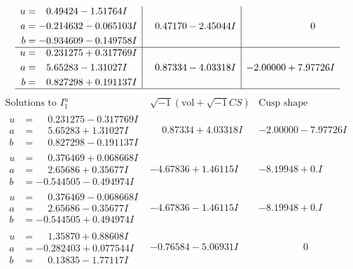 \documentclass[1p]{elsarticle_modified}
\theoremstyle{definition}
\newcommand{\I}{\sqrt{-1}}
\begin{document}
$$\begin{array}{c|c|c}
\begin{aligned}
u &= \phantom{-}0.49424 - 1.51764 I \\
a &= -0.214632 - 0.065103 I \\
b &= -0.934609 - 0.149758 I\end{aligned}
 & \phantom{-}0.47170 - 2.45044 I & \phantom{-0.000000 } 0 \\ \hline\begin{aligned}
u &= \phantom{-}0.231275 + 0.317769 I \\
a &= \phantom{-}5.65283 - 1.31027 I \\
b &= \phantom{-}0.827298 + 0.191137 I\end{aligned}
 & \phantom{-}0.87334 - 4.03318 I & -2.00000 + 7.97726 I\\
 \hline 
 \end{array}$$\newpage$$\begin{array}{c|c|c}  
\text{Solutions to }I^u_{1}& \I (\text{vol} + \sqrt{-1}CS) & \text{Cusp shape}\\
 \hline 
\begin{aligned}
u &= \phantom{-}0.231275 - 0.317769 I \\
a &= \phantom{-}5.65283 + 1.31027 I \\
b &= \phantom{-}0.827298 - 0.191137 I\end{aligned}
 & \phantom{-}0.87334 + 4.03318 I & -2.00000 - 7.97726 I \\ \hline\begin{aligned}
u &= \phantom{-}0.376469 + 0.068668 I \\
a &= \phantom{-}2.65686 + 0.35677 I \\
b &= -0.544505 - 0.494974 I\end{aligned}
 & -4.67836 + 1.46115 I & -8.19948 + 0. I\phantom{ +0.000000I} \\ \hline\begin{aligned}
u &= \phantom{-}0.376469 - 0.068668 I \\
a &= \phantom{-}2.65686 - 0.35677 I \\
b &= -0.544505 + 0.494974 I\end{aligned}
 & -4.67836 - 1.46115 I & -8.19948 + 0. I\phantom{ +0.000000I} \\ \hline\begin{aligned}
u &= \phantom{-}1.35870 + 0.88608 I \\
a &= -0.282403 + 0.077544 I \\
b &= \phantom{-}0.13835 - 1.77117 I\end{aligned}
 & -0.76584 - 5.06931 I & \phantom{-0.000000 } 0 \\ \hline\begin{aligned}

\end{aligned}
\end{array}$$
\end{document}
